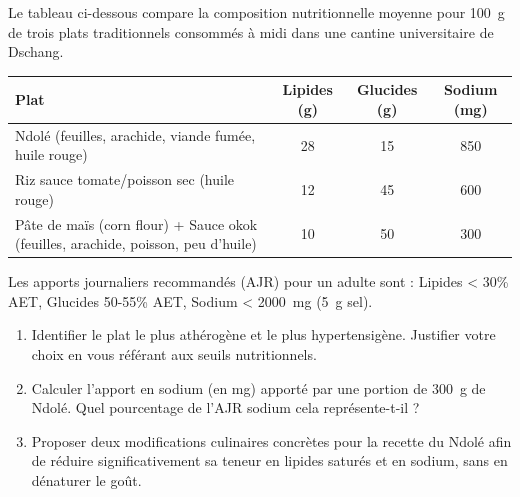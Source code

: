 \documentclass[11pt]{article}
\begin{document}
\begin{exercice}
\label{exo:alimentation}
Le tableau ci-dessous compare la composition nutritionnelle moyenne pour \SI{100}{\gram} de trois plats traditionnels consommés à midi dans une cantine universitaire de Dschang.

\begin{center}
\begin{tabular}{lccc}
\toprule
\textbf{Plat} & \textbf{Lipides (g)} & \textbf{Glucides (g)} & \textbf{Sodium (mg)} \\
\midrule
Ndolé (feuilles, arachide, viande fumée, huile rouge) & 28 & 15 & 850 \\
Riz sauce tomate/poisson sec (huile rouge) & 12 & 45 & 600 \\
Pâte de maïs (corn flour) + Sauce okok (feuilles, arachide, poisson, peu d'huile) & 10 & 50 & 300 \\
\bottomrule
\end{tabular}
\end{center}
Les apports journaliers recommandés (AJR) pour un adulte sont : Lipides < 30\% AET, Glucides 50-55\% AET, Sodium < \SI{2000}{\milli\gram} (\SI{5}{\gram} sel).

\begin{enumerate}
    \item Identifier le plat le plus athérogène et le plus hypertensigène. Justifier votre choix en vous référant aux seuils nutritionnels.
    \item Calculer l'apport en sodium (en mg) apporté par une portion de \SI{300}{\gram} de Ndolé. Quel pourcentage de l'AJR sodium cela représente-t-il ?
    \item Proposer deux modifications culinaires concrètes pour la recette du Ndolé afin de réduire significativement sa teneur en lipides saturés et en sodium, sans en dénaturer le goût.
\end{enumerate}
\end{exercice}
\end{document}
